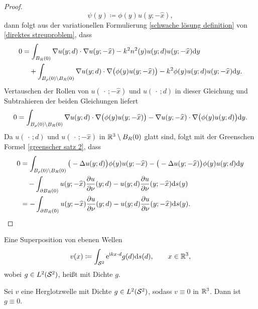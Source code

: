 \begin{proof}
	\begin{equation*}
		\psi(y)\coloneqq \phi(y)u(y;-\widehat{x}),
	\end{equation*}
	dann folgt aus der variationellen Formulierung \eqref{schwache lösung definition} von \eqref{direktes streuproblem}, dass
	\begin{align*}
		0&=\int_{B_R(0)} \nabla u(y;d)\cdot\nabla u(y;-\widehat{x}) - k^2n^2(y)u(y;d)u(y;-\widehat{x})\mathrm{d}y\\
		&\quad+\int_{B_\rho(0)\setminus B_R(0)} \nabla u(y;d)\cdot\nabla\big(\phi(y)u(y;-\widehat{x})\big) - k^2\phi(y)u(y;d)u(y;-\widehat{x})\mathrm{d}y.
	\end{align*}
	Vertauschen der Rollen von \(u(\,\cdot\,;-\widehat{x})\) und \(u(\,\cdot\,;d)\) in dieser Gleichung und Subtrahieren der beiden Gleichungen liefert
	\begin{equation*}
		0=\int_{B_\rho(0)\setminus B_R(0)} \nabla u(y;d)\cdot \nabla\big(\phi(y)u(y;-\widehat{x})\big) - \nabla u(y;-\widehat{x})\cdot\nabla\big(\phi(y)u(y;d)\big) \mathrm{d}y.
	\end{equation*}
	Da \(u(\,\cdot\,;d)\) und \(u(\,\cdot\,;-\widehat{x})\) in \(\mathbb{R}^3\setminus B_R(0)\) glatt sind, folgt mit der Greenschen Formel \eqref{greenscher satz 2}, dass
	\begin{align*}
		0&=\int_{B_\rho(0)\setminus B_R(0)} \big(-\Delta u(y;d)\big)\phi(y)u(y;-\widehat{x}) - \big(-\Delta u(y;-\widehat{x})\big)\phi(y)u(y;d) \mathrm{d}y\\
		&\quad-\int_{\partial B_R(0)} u(y;-\widehat{x})\frac{\partial u}{\partial\nu}(y;d) - u(y;d)\frac{\partial u}{\partial\nu}(y;-\widehat{x}) \mathrm{d}s(y)\\
		&=-\int_{\partial B_R(0)} u(y;-\widehat{x})\frac{\partial u}{\partial\nu}(y;d) - u(y;d)\frac{\partial u}{\partial\nu}(y;-\widehat{x}) \mathrm{d}s(y).
	\end{align*}
\end{proof}
\begin{definition}
	Eine Superposition von ebenen Wellen
	\begin{equation}
		\label{superposition von ebenen wellen}
		v(x)\coloneqq\int_{\mathcal{S}^2}\mathrm{e}^{\mathrm{i} kx\cdot d}g(d)\mathrm{d}s(d),\qquad x\in\mathbb{R}^3,
	\end{equation}
	wobei \(g\in L^2(\mathcal{S}^2)\), heißt  mit Dichte \(g\).
\end{definition}
\begin{satz}
	Sei \(v\) eine Herglotzwelle mit Dichte \(g\in L^2(\mathcal{S}^2)\), sodass \(v\equiv0\) in \(\mathbb{R}^3\). Dann ist \(g\equiv0\).
\end{satz}
